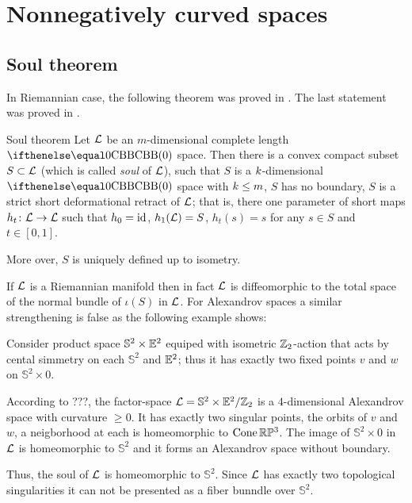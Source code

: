 \chapter{Nonnegatively curved spaces}


\section{Soul theorem}

In Riemannian case, the following theorem was proved in \cite{cheeger-gromoll-soul}.
The last statement was proved in \cite{sharafutdinov}.

\begin{thm}{Soul theorem}
Let $\mathcal{L}$ be an $m$-dimensional complete length $\Alex0$ space. 
Then there is a convex compact subset $S\subset \spc{L}$ (which is called \emph{soul} of $\mathcal{L}$), such that  $S$ is a $k$-dimensional $\Alex{0}$ space with $\kay\le m$,
$S$ has no boundary,
$S$ is a strict short deformational retract of $\mathcal{L}$; that is, there one parameter of short maps $h_t\:\spc{L}\to \spc{L}$ such that $h_0=\mathop{\rm id}\nolimits$, $h_1(\mathcal{L})=S$, $h_t(s)=s$ for any $s\in S$ and $t\in[0,1]$.

More over, $S$ is uniquely defined up to isometry.
\end{thm}

If $\mathcal{L}$ is a Riemannian manifold then in fact
$\mathcal{L}$ is diffeomorphic to the total space of the normal bundle of $\iota(S)$ in $\mathcal{L}$. 
For Alexandrov spaces a similar strengthening is false as the following example shows:

 Consider product space $\mathbb{S}^2\times \EE^2$ equiped with isometric $\mathbb{Z}_2$-action that acts by cental simmetry on each $\mathbb{S}^2$ and $\mathbb{E}^2$; thus it has exactly two fixed points $v$ and $w$ on $\mathbb{S}^2\times 0$.

According to ???,
the factor-space $\spc{L}=\mathbb{S}^2\times \EE^2/\ZZ_2$ is a $4$-dimensional Alexandrov space with curvature $\ge 0$.
It has exactly two singular points, the orbits of $v$ and $w$, a neigborhood at each is homeomorphic to $\mathop{\rm Cone}\nolimits\mathbb{R}\mathbb{P}^3$.
The image of $\mathbb{S}^2\times 0$ in $\mathcal{L}$ is homeomorphic to $\mathbb{S}^2$ and it forms an Alexandrov space without boundary.

Thus, the soul of $\mathcal{L}$ is homeomorphic to $\mathbb{S}^2$. 
Since $\mathcal{L}$ has exactly two topological singularities it can not be presented as a fiber bunndle over $\mathbb{S}^2$. 

